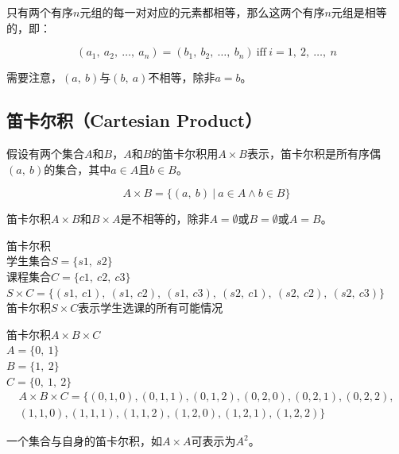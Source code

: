 \documentclass[12pt, openany, oneside]{book}
\begin{document}
只有两个有序$ n $元组的每一对对应的元素都相等，那么这两个有序$ n $元组是相等的，即：

\vspace{-0.5cm}

$$
	(a_1,\ a_2,\ \dots,\ a_n) = (b_1,\ b_2,\ \dots,\ b_n)\ \text{iff}\ i = 1,\ 2,\ \dots,\ n
$$

需要注意，$ (a,\ b) $与$ (b,\ a) $不相等，除非$ a = b $。\\

\subsection{笛卡尔积（Cartesian Product）}

假设有两个集合$ A $和$ B $，$ A $和$ B $的笛卡尔积用$ A \times B $表示，笛卡尔积是所有序偶$ (a,\ b) $的集合，其中$ a \in A $且$ b \in B $。

\vspace{-0.5cm}

$$
	A \times B = \{(a,\ b)\ |\ a \in A \wedge b \in B\}
$$

笛卡尔积$ A \times B $和$ B \times A $是不相等的，除非$ A = \emptyset $或$ B = \emptyset $或$ A = B $。

\begin{tcolorbox}
	笛卡尔积\\
	学生集合$ S = \{s1,\ s2\} $\\
	课程集合$ C = \{c1,\ c2,\ c3\} $\\
	$ S \times C = \{(s1,\ c1),\ (s1,\ c2),\ (s1,\ c3),\ (s2,\ c1),\ (s2,\ c2),\ (s2,\ c3)\} $\\
	笛卡尔积$ S \times C $表示学生选课的所有可能情况\\
\end{tcolorbox}

\begin{tcolorbox}
	笛卡尔积$ A \times B \times C $\\
	$ A = \{0,\ 1\} $\\
	$ B = \{1,\ 2\} $\\
	$ C = \{0,\ 1,\ 2\} $
	\begin{align*}
		A \times B \times C = \{(0, 1, 0), (0, 1, 1), (0, 1, 2), (0, 2, 0), (0, 2, 1), (0, 2, 2), \\
		(1, 1, 0), (1, 1, 1), (1, 1, 2), (1, 2, 0), (1, 2, 1), (1, 2, 2)\}
	\end{align*}
\end{tcolorbox}

一个集合与自身的笛卡尔积，如$ A \times A $可表示为$ A^2 $。
\end{document}
